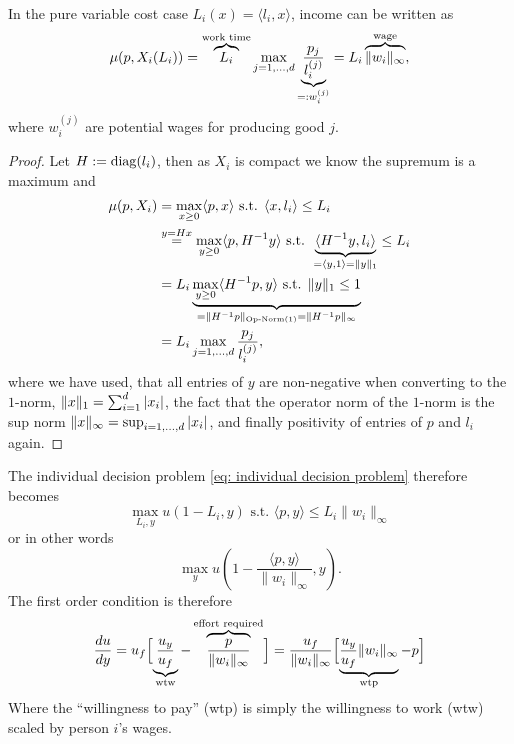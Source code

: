 \begin{lemma}
	In the pure variable cost case \(L_i(x) = \langle l_i, x\rangle\), income
	can be written as
	\[
		\mu(p, X_i(L_i))
		= \overbrace{L_i}^{\text{work time}} \max_{j=1,\dots,d}
		\underbrace{\frac{p_j}{l_i^{(j)}}}_{=: w_i^{(j)}}
		= L_i \overbrace{\|w_i\|_\infty}^{\text{wage}},
	\]
	where \(w_i^{(j)}\) are potential wages for producing good \(j\).
\end{lemma}
\begin{proof}
	Let \(H:= \operatorname{diag}(l_i)\), then as \(X_i\) is compact we know the supremum is
	a maximum and
	\begin{align*}
		\mu(p, X_i)
		&= \max_{x\ge 0} \langle p, x\rangle
		\text{ s.t. } \langle x, l_i\rangle \le L_i\\
		&\overset{y=Hx}= \max_{y\ge 0} \langle p, H^{-1}y\rangle
		\text{ s.t. } \underbrace{\langle H^{-1}y, l_i\rangle}_{
			= \langle y, 1 \rangle = \|y\|_1
		} \le L_i\\
		&= L_i \underbrace{
			\max_{y\ge 0} \langle H^{-1}p, y\rangle \text{ s.t. } \|y\|_1 \le 1
		}_{
			= \|H^{-1} p\|_{\text{Op-Norm(1)}} = \|H^{-1} p \|_\infty
		}\\
		&= L_i \max_{j=1,\dots,d} \frac{p_j}{l_i^{(j)}},
	\end{align*}
	where we have used, that all entries of \(y\) are non-negative when
	converting to the \(1\)-norm, \(\|x\|_1 = \sum_{i=1}^d |x_i|\), the
	fact that the operator norm of the \(1\)-norm is the sup norm
	\(\|x\|_\infty = \sup_{i=1,\dots,d} |x_i|\),
	and finally positivity of entries of \(p\) and \(l_i\) again.
\end{proof}

\begin{example*}
	The individual decision problem \eqref{eq: individual decision problem}
	therefore becomes
	\[
		\max_{L_i, y} u(1-L_i, y) \text{ s.t. } \langle p, y\rangle \le L_i \|w_i\|_\infty
	\]
	or in other words
	\[
		\max_{y} u\left(1- \frac{\langle p, y\rangle}{\|w_i\|_\infty}, y\right).
	\]
	The first order condition is therefore
	\[
		\frac{du}{dy} 
		= u_f\Bigl[
			\underbrace{\frac{u_y}{u_f}}_{\text{wtw}}
			- \overbrace{\frac{p}{\|w_i\|_\infty}}^{\text{effort required}}
		\Bigr]
		= \frac{u_f}{\|w_i\|_\infty}\Bigl[
			\underbrace{\frac{u_y}{u_f}\|w_i\|_\infty}_{\text{wtp}}
			- p
		\Bigr]
	\]
	Where the ``willingness to pay'' (wtp) is simply the willingness to work
	(wtw) scaled by person \(i\)'s wages.
	
\end{example*}


